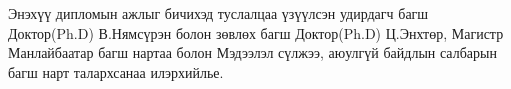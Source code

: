 
\begin{acknowledgements}
    \addchaptertocentry{\acknowledgementname}

    Энэхүү дипломын ажлыг бичихэд туслалцаа үзүүлсэн удирдагч багш \\
    Доктор(Ph.D) В.Нямсүрэн болон зөвлөх багш Доктор(Ph.D) Ц.Энхтөр, Магистр Манлайбаатар багш нартаа болон Мэдээлэл сүлжээ, аюулгүй байдлын салбарын багш нарт талархсанаа илэрхийлье.


\end{acknowledgements}

